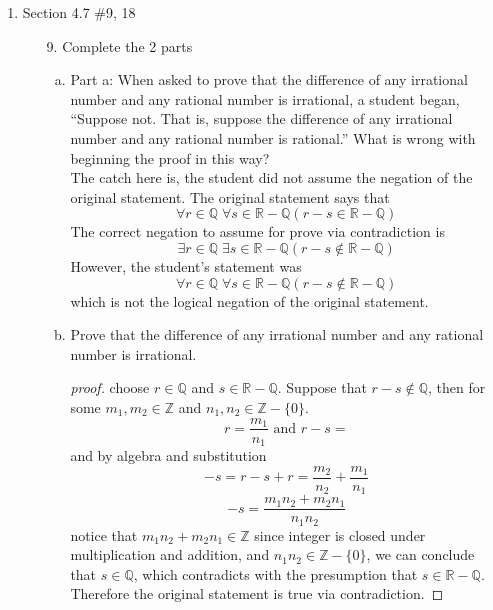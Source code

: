 \documentclass[12pt]{article}
\newcommand{\Z}{\mathbb{Z}}
\newcommand{\R}{\mathbb{R}}
\newcommand{\Q}{\mathbb{Q}}
\newcommand{\paren}[1]{\left( #1 \right)}
\newcommand{\zero}{\{0\}}
\begin{document}
\begin{enumerate}
\begin{proof}
        Hence, we conclude:
        \[
        \forall x \in \mathbb{R} \left( \left( \forall \epsilon > 0 : |x| < \epsilon \right) \rightarrow x = 0 \right).
        \]
        \end{proof}
    \newpage
    \item Section 4.7 \#9, 18
        \begin{enumerate}
            \item[9.] Complete the 2 parts
                \begin{enumerate}[a.]
                    \item Part a: When asked to prove that the difference of any irrational number and any rational number is irrational, a student began, “Suppose not. That is, suppose the difference of any irrational number and any rational number is rational.” What is wrong with beginning the proof in this way? \\
                        The catch here is, the student did not assume the negation of the original statement. The original statement says that
                        \[
                        \forall r \in \Q \; \forall s \in \R - \Q \paren{r-s\in \R - \Q}
                        \]
                        The correct negation to assume for prove via contradiction is
                        \[
                        \exists r \in \Q \; \exists s \in \R - \Q \paren{r-s \notin \R - \Q}
                        \]
                        However, the student's statement was
                        \[
                        \forall r \in \Q \; \forall s \in \R - \Q \paren{r-s\notin \R - \Q}
                        \]
                        which is not the logical negation of the original statement. 
                    \item Prove that the difference of any irrational number and any rational number is irrational.
                        \begin{proof}[proof]
                            choose $r\in \Q$ and $s \in \R-\Q$. Suppose that $r-s \notin \Q$, then for some $m_1, m_2 \in \Z$ and $n_1, n_2 \in \Z - \zero$.
                            \[
                            r = \frac{m_1}{n_1} \text{ and } r-s = 
                            \]
                            and by algebra and substitution
                            \[
                            -s = r-s + r = \frac{m_2}{n_2} + \frac{m_1}{n_1}
                            \]
                            \[
                            -s = \frac{m_1n_2 + m_2n_1}{n_1n_2}
                            \]
                            notice that $m_1n_2 + m_2n_1 \in \Z$ since integer is closed under multiplication and addition, and $n_1n_2 \in \Z - \zero$, we can conclude that $s \in \Q$, which contradicts with the presumption that $s \in \R - \Q$. Therefore the original statement is true via contradiction. 
                        

\end{proof}
\end{enumerate}
\end{enumerate}
\end{enumerate}
\end{document}
